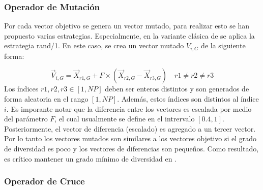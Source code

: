 \subsubsection{Operador de Mutación}

Por cada vector objetivo se genera un vector mutado, para realizar esto se han propuesto varias estrategias.
%
Especialmente, en la variante clásica de \DE{} se aplica la estrategia rand/1.
%
En este caso, se crea un vector mutado $V_{i,G}$ de la siguiente forma:

\begin{equation}\label{eqn:mutation}
\vec{V}_{i,G} = \vec{X}_{r1, G} + F \times (\vec{X}_{r2, G} - \vec{X}_{r3, G}) \quad r1 \neq r2 \neq r3
\end{equation}
%
Los índices $r1, r2, r3 \in [1,NP]$ deben ser enteros distintos y son generados de forma aleatoria en el rango $[1, NP]$.
%
Además, estos índices son distintos al índice $i$.
%
Es imporante notar que la diferencia entre los vectores es escalada por medio del parámetro $F$, el cual usualmente se define en el intrervalo $[0.4, 1]$.
%
Posteriormente, el vector de diferencia (escalado) es agregado a un tercer vector.
%
Por lo tanto los vectores mutados son similares a los vectores objetivo si el grado de diversidad es poco y los vectores de diferencias son pequeños.
%
Como resultado, es crítico mantener un grado mínimo de diversidad en \DE{}.

\subsubsection{Operador de Cruce}

